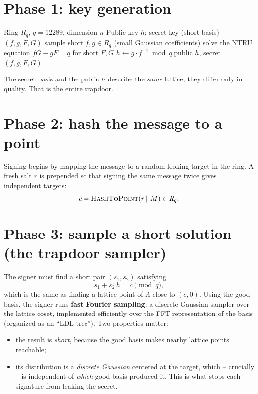 \section{Phase 1: key generation}

\begin{algorithm}[H]
\caption{FN-DSA.KeyGen (teaching form)}
\label{alg:fndsa-keygen}
\begin{algorithmic}[1]
\Require Ring $R_q$, $q=12289$, dimension $n$
\Ensure Public key $h$; secret key (short basis) $(f,g,F,G)$
\Repeat
  \State sample short $f, g \in R_q$ (small Gaussian coefficients)
\State solve the NTRU equation $fG - gF = q$ for short $F, G$
\State $h \gets g \cdot f^{-1} \bmod q$
\State \Return public $h$, secret $(f,g,F,G)$
\end{algorithmic}
\end{algorithm}

The secret basis and the public $h$ describe the \emph{same} lattice; they differ only in quality. That is the entire trapdoor.

\section{Phase 2: hash the message to a point}

Signing begins by mapping the message to a random-looking target in the ring. A fresh salt $r$ is prepended so that signing the same message twice gives independent targets:
\[
c = \textsc{HashToPoint}(r \,\|\, M) \in R_q.
\]

\section{Phase 3: sample a short solution (the trapdoor sampler)}

The signer must find a short pair $(s_1, s_2)$ satisfying
\[
s_1 + s_2\,h = c \pmod q,
\]
which is the same as finding a lattice point of $\Lambda$ close to $(c, 0)$. Using the good basis, the signer runs \textbf{fast Fourier sampling}: a discrete Gaussian sampler over the lattice coset, implemented efficiently over the FFT representation of the basis (organized as an ``LDL tree''). Two properties matter:

\begin{itemize}
  \item the result is \emph{short}, because the good basis makes nearby lattice points reachable;
  \item its distribution is a \emph{discrete Gaussian} centered at the target, which -- crucially -- is independent of \emph{which} good basis produced it. This is what stops each signature from leaking the secret.
\end{itemize}

